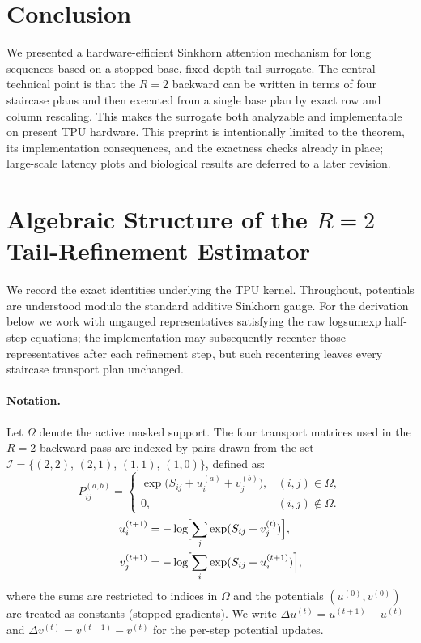 \documentclass{article}
\begin{document}
\section{Conclusion}
We presented a hardware-efficient Sinkhorn attention mechanism for long sequences based on a stopped-base, fixed-depth tail surrogate. The central technical point is that the $R=2$ backward can be written in terms of four staircase plans and then executed from a single base plan by exact row and column rescaling. This makes the surrogate both analyzable and implementable on present TPU hardware. This preprint is intentionally limited to the theorem, its implementation consequences, and the exactness checks already in place; large-scale latency plots and biological results are deferred to a later revision.




\newpage
\appendix

\section{Algebraic Structure of the \texorpdfstring{$R=2$}{R=2} Tail-Refinement Estimator}
\label{app:proof}

We record the exact identities underlying the TPU kernel. Throughout, potentials are understood modulo the standard additive Sinkhorn gauge. For the derivation below we work with ungauged representatives satisfying the raw logsumexp half-step equations; the implementation may subsequently recenter those representatives after each refinement step, but such recentering leaves every staircase transport plan unchanged.

\paragraph{Notation.}
Let $\Omega$ denote the active masked support. The four transport matrices used in the $R=2$ backward pass are indexed by pairs drawn from the set $\mathcal{I} = \{(2,2),\,(2,1),\,(1,1),\,(1,0)\}$, defined as:
\begin{equation}
    P^{(a,b)}_{ij} =
    \begin{cases}
        \exp\!\bigl(S_{ij} + u^{(a)}_i + v^{(b)}_j\bigr), & (i,j)\in\Omega, \\
        0, & (i,j)\notin\Omega.
    \end{cases}
\end{equation}
\begin{align}
    u^{(t+1)}_i &= -\log\!\Bigl[\sum_j \exp(S_{ij} + v^{(t)}_j)\Bigr], \label{eq:u_update_app}\\
    v^{(t+1)}_j &= -\log\!\Bigl[\sum_i \exp(S_{ij} + u^{(t+1)}_i)\Bigr], \label{eq:v_update_app}
\end{align}
where the sums are restricted to indices in $\Omega$ and the potentials $(u^{(0)}, v^{(0)})$ are treated as constants (stopped gradients). We write $\Delta u^{(t)} = u^{(t+1)} - u^{(t)}$ and $\Delta v^{(t)} = v^{(t+1)} - v^{(t)}$ for the per-step potential updates.
\end{document}
